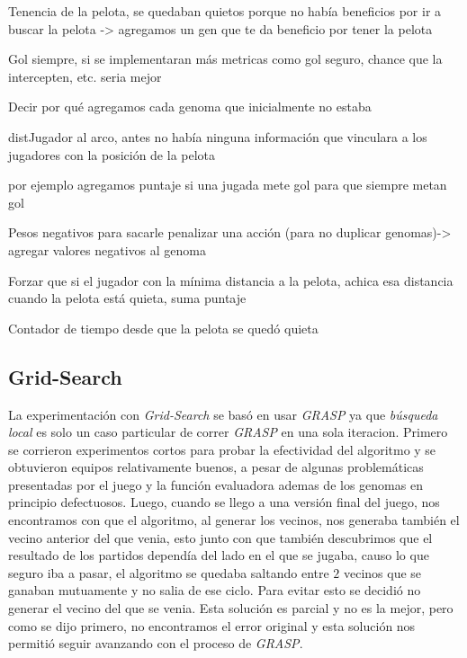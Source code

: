 Tenencia de la pelota, se quedaban quietos porque no había beneficios por ir a buscar la pelota -> agregamos un gen que te da beneficio por tener la pelota

Gol siempre, si se implementaran más metricas como gol seguro, chance que la intercepten, etc. seria mejor

Decir por qué agregamos cada genoma que inicialmente no estaba

distJugador al arco, antes no había ninguna información que vinculara a los jugadores con la posición de la pelota

por ejemplo agregamos puntaje si una jugada mete gol para que siempre metan gol

Pesos negativos para sacarle penalizar una acción (para no duplicar genomas)-> agregar valores negativos al genoma


Forzar que si el jugador con la mínima distancia a la pelota, achica esa distancia cuando la pelota está quieta, suma puntaje

Contador de tiempo desde que la pelota se quedó quieta




\subsection{Grid-Search}

La experimentación con \emph{Grid-Search} se basó en usar \emph{GRASP} ya que \emph{búsqueda local} es solo un caso particular
de correr \emph{GRASP} en una sola iteracion.
Primero se corrieron experimentos cortos para probar la efectividad del algoritmo y se obtuvieron equipos relativamente buenos,
a pesar de algunas problemáticas presentadas por el juego y la función evaluadora ademas de los genomas en principio defectuosos.
Luego, cuando se llego a una versión final del juego, nos encontramos con que el algoritmo, al generar los vecinos, nos generaba también
el vecino anterior del que venia, esto junto con que también descubrimos que el resultado de los partidos dependía del lado en el
que se jugaba, causo lo que seguro iba a pasar, el algoritmo se quedaba saltando entre $2$ vecinos que se ganaban mutuamente y no
salia de ese ciclo.
Para evitar esto se decidió no generar el vecino del que se venia. Esta solución es parcial y no es la mejor, pero como se dijo primero,
no encontramos el error original y esta solución nos permitió seguir avanzando con el proceso de \emph{GRASP}.
